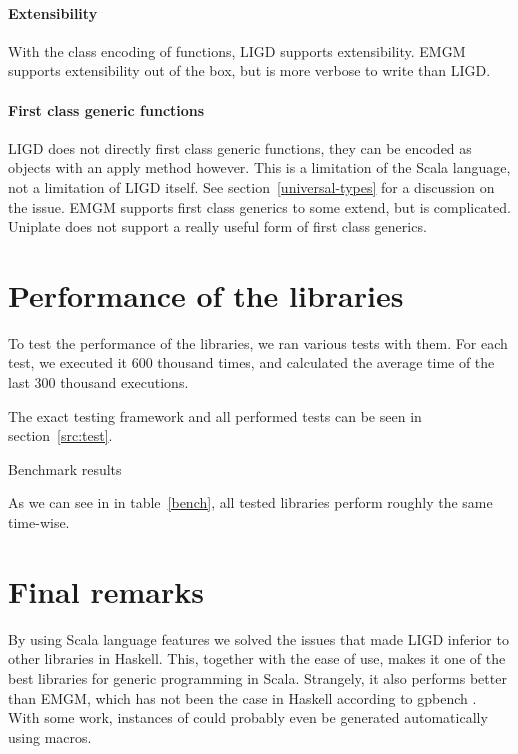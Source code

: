 \paragraph{Extensibility}
With the class encoding of functions, LIGD supports
extensibility. EMGM supports extensibility out of the box, but is more verbose
to write than LIGD. 

\paragraph{First class generic functions}
LIGD does not directly first class generic functions, they can be encoded as
objects with an apply method however. This is a limitation of the Scala
language, not a limitation of LIGD itself. See section~\ref{universal-types}
for a discussion on the issue. EMGM supports first class generics to some
extend, but is complicated. Uniplate does not support a really useful form
of first class generics. 

\section{Performance of the libraries}

To test the performance of the libraries, we ran various tests with them. For
each test, we executed it 600 thousand times, and calculated the average
time of the last 300 thousand executions.

The exact testing framework and all performed tests can be seen in
section~\ref{src:test}.

\begin{table}[ht]

\caption{Benchmark results}
\label{bench}
\end{table}

As we can see in in table~\ref{bench}, all tested libraries perform roughly
the same time-wise.

\section{Final remarks}
By using Scala language features we solved the issues that made LIGD inferior to
other libraries in Haskell. This, together with the ease of use, makes it one
of the best libraries for generic programming in Scala. Strangely, it also
performs better than EMGM, which has not been the case in Haskell according
to gpbench \cite{DBLP:conf/haskell/RodriguezJJGKO08}. With some work, instances
of  could probably even be generated automatically using macros. 

